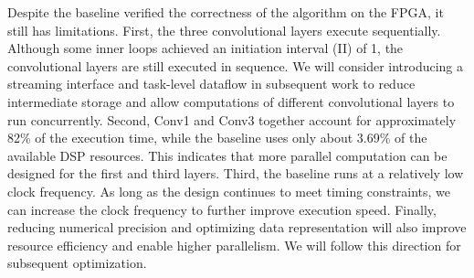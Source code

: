Despite the baseline verified the correctness of the algorithm on the FPGA, it still has limitations. First, the three convolutional layers execute sequentially. Although some inner loops achieved an initiation interval (II) of 1, the convolutional layers are still executed in sequence. We will consider introducing a streaming interface and task-level dataflow in subsequent work to reduce intermediate storage and allow computations of different convolutional layers to run concurrently. Second, Conv1 and Conv3 together account for approximately 82\% of the execution time, while the baseline uses only about 3.69\% of the available DSP resources. This indicates that more parallel computation can be designed for the first and third layers. Third, the baseline runs at a relatively low clock frequency. As long as the design continues to meet timing constraints, we can increase the clock frequency to further improve execution speed. Finally, reducing numerical precision and optimizing data representation will also improve resource efficiency and enable higher parallelism. We will follow this direction for subsequent optimization.
